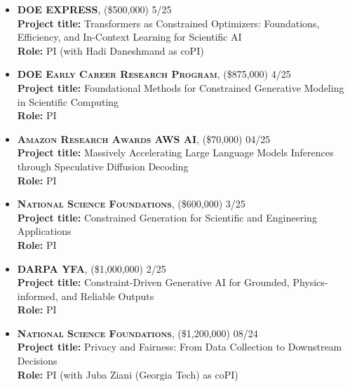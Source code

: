 

\medskip

\begin{itemize}
	\item \textbf{\textsc{DOE EXPRESS}}, 
	(\$500,000)  \hfill \textsc{5/25}\\
	{\bf Project title:} {Transformers as Constrained Optimizers: Foundations, Efficiency, and In-Context Learning for Scientific AI}\\
	{\bf Role:} PI (with Hadi Daneshmand as coPI)

	\item \textbf{\textsc{DOE Early Career Research Program}}, 
	(\$875,000)  \hfill \textsc{4/25}\\
	{\bf Project title:} {Foundational Methods for Constrained Generative Modeling in Scientific Computing}\\
	{\bf Role:} PI

	\item \textbf{\textsc{Amazon Research Awards AWS AI}}, 
	(\$70,000) \hfill \textsc{04/25}\\
	{\bf Project title:} {Massively Accelerating Large Language Models Inferences through Speculative Diffusion Decoding}\\
	{\bf Role:} PI


	\item \textbf{\textsc{National Science Foundations}}, 
	(\$600,000)  \hfill \textsc{3/25}\\
	{\bf Project title:} {Constrained Generation for Scientific and Engineering Applications}\\
	{\bf Role:} PI

	\item \textbf{\textsc{DARPA YFA}}, 
	(\$1,000,000)  \hfill \textsc{2/25}\\
	{\bf Project title:} {Constraint-Driven Generative AI for Grounded, Physics-informed, and Reliable Outputs}\\
	{\bf Role:} PI

	\item \textbf{\textsc{National Science Foundations}}, 
	(\$1,200,000) \hfill \textsc{08/24}\\
	{\bf Project title:} {Privacy and Fairness: From Data Collection to Downstream Decisions}\\
	{\bf Role:} PI (with Juba Ziani (Georgia Tech) as coPI)


\end{itemize}
